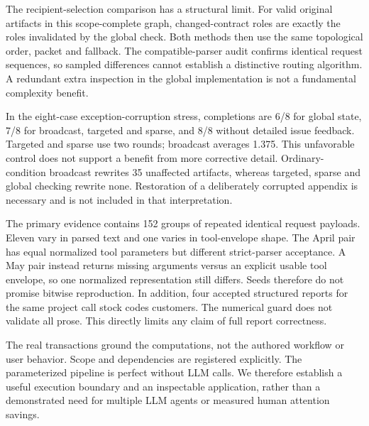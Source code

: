 The recipient-selection comparison has a structural limit. For valid original artifacts in this scope-complete graph, changed-contract roles are exactly the roles invalidated by the global check. Both methods then use the same topological order, packet and fallback. The compatible-parser audit confirms identical request sequences, so sampled differences cannot establish a distinctive routing algorithm. A redundant extra inspection in the global implementation is not a fundamental complexity benefit.

In the eight-case exception-corruption stress, completions are 6/8 for global state, 7/8 for broadcast, targeted and sparse, and 8/8 without detailed issue feedback. Targeted and sparse use two rounds; broadcast averages 1.375. This unfavorable control does not support a benefit from more corrective detail. Ordinary-condition broadcast rewrites 35 unaffected artifacts, whereas targeted, sparse and global checking rewrite none. Restoration of a deliberately corrupted appendix is necessary and is not included in that interpretation.

The primary evidence contains 152 groups of repeated identical request payloads. Eleven vary in parsed text and one varies in tool-envelope shape. The April pair has equal normalized tool parameters but different strict-parser acceptance. A May pair instead returns missing arguments versus an explicit usable tool envelope, so one normalized representation still differs. Seeds therefore do not promise bitwise reproduction. In addition, four accepted structured reports for the same project call stock codes customers. The numerical guard does not validate all prose. This directly limits any claim of full report correctness.

The real transactions ground the computations, not the authored workflow or user behavior. Scope and dependencies are registered explicitly. The parameterized pipeline is perfect without LLM calls. We therefore establish a useful execution boundary and an inspectable application, rather than a demonstrated need for multiple LLM agents or measured human attention savings.
